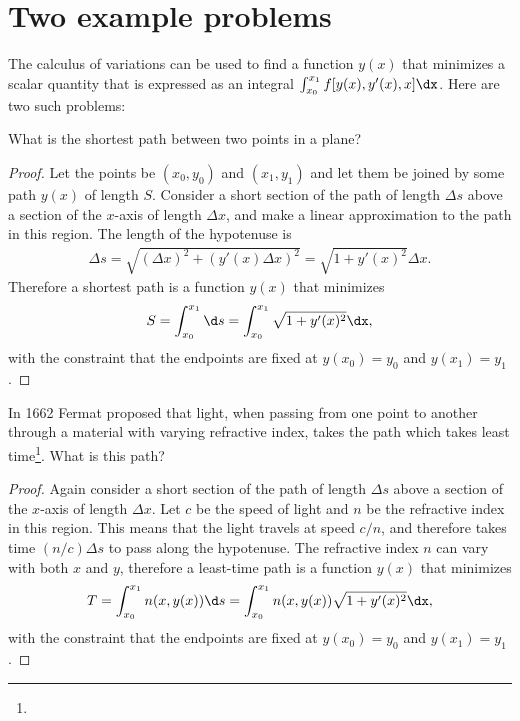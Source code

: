 
\section{Two example problems}
The calculus of variations can be used to find a function $y(x)$ that minimizes a scalar quantity
that is expressed as an integral $\int_{x_0}^{x_1} f[y(x), y'(x), x] \dx$. Here are two such
problems:

\begin{question*}
  What is the shortest path between two points in a plane?
\end{question*}

\begin{proof}
  Let the points be $(x_0, y_0)$ and $(x_1, y_1)$ and let them be joined by some path $y(x)$ of
  length $S$. Consider a short section of the path of length $\Delta s$ above a section of the
  $x$-axis of length $\Delta x$, and make a linear approximation to the path in this region. The
  length of the hypotenuse is
  \begin{align*}
    \Delta s = \sqrt{(\Delta x)^2 + (y'(x)\Delta x)^2} = \sqrt{1 + y'(x)^2} \Delta x.
  \end{align*}
  Therefore a shortest path is a function $y(x)$ that minimizes
  \begin{align*}
    S = \int_{x_0}^{x_1} \d s = \int_{x_0}^{x_1} \sqrt{1 + y'(x)^2} \dx,
  \end{align*}
  with the constraint that the endpoints are fixed at $y(x_0) = y_0$ and $y(x_1) = y_1$.

\end{proof}


\begin{question*}
  In 1662 Fermat proposed that light, when passing from one point to another through a material with
  varying refractive index, takes the path which takes least time\footnote{}. What
  is this path?
\end{question*}

\begin{proof}
  Again consider a short section of the path of length $\Delta s$ above a section of the $x$-axis of
  length $\Delta x$. Let $c$ be the speed of light and $n$ be the refractive index in this
  region. This means that the light travels at speed $c/n$, and therefore takes time $(n/c)\Delta s$
  to pass along the hypotenuse. The refractive index $n$ can vary with both $x$ and $y$, therefore a
  least-time path is a function $y(x)$ that minimizes
  \begin{align*}
    T = \int_{x_0}^{x_1} n(x, y(x)) \d s = \int_{x_0}^{x_1} n(x, y(x)) \sqrt{1 + y'(x)^2} \dx,
  \end{align*}
  with the constraint that the endpoints are fixed at $y(x_0) = y_0$ and $y(x_1) = y_1$.

\end{proof}

